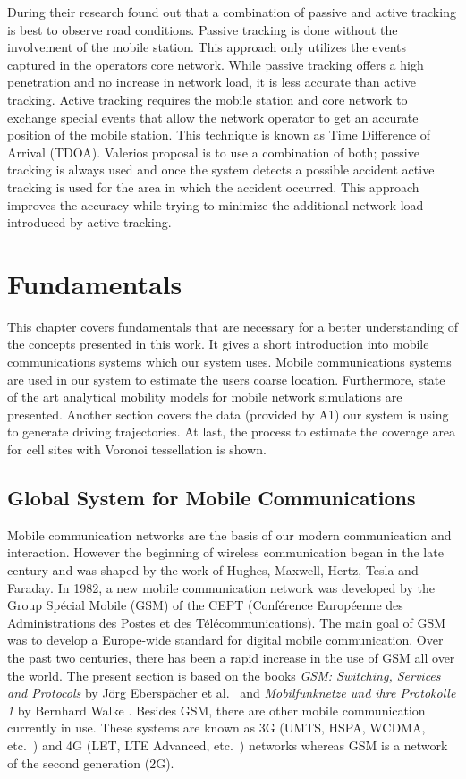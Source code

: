 \documentclass[master,english]{hgbthesis}
\begin{document}
During their research found out that a combination of passive and active tracking is best to observe road conditions. Passive tracking is done without the involvement of the mobile station. This approach only utilizes the events captured in the operators core network. While passive tracking offers a high penetration and no increase in network load, it is less accurate than active tracking. Active tracking requires the mobile station and core network to exchange special events that allow the network operator to get an accurate position of the mobile station. This technique is known as Time Difference of Arrival (TDOA). Valerios proposal is to use a combination of both; passive tracking is always used and once the system detects a possible accident active tracking is used for the area in which the accident occurred. This approach improves the accuracy while trying to minimize the additional network load introduced by active tracking.
\chapter{Fundamentals}
\label{cha:fundamentals}
This chapter covers fundamentals that are necessary for a better understanding of the concepts presented in this work. It gives a short introduction into mobile communications systems which our system uses. Mobile communications systems are used in our system to estimate the users coarse location. Furthermore, state of the art analytical mobility models for mobile network simulations are presented. Another section covers the data (provided by A1) our system is using to generate driving trajectories. At last, the process to estimate the coverage area for cell sites with Voronoi tessellation is shown.
\section{Global System for Mobile Communications}
Mobile communication networks are the basis of our modern communication and interaction. However the beginning of wireless communication began in the late  century and was shaped by the work of Hughes, Maxwell, Hertz, Tesla and Faraday.
In 1982, a new mobile communication network was developed by the Group Spécial Mobile (GSM) of the CEPT (Conférence Européenne des Administrations des Postes et des Télécommunications). The main goal of GSM was to develop a Europe-wide standard for digital mobile communication. Over the past two centuries, there has been a rapid increase in the use of GSM all over the world. The present section is based on the books \emph{GSM: Switching, Services and Protocols} by Jörg Eberspächer et al.\ \cite{Eberspaecher2001} and \emph{Mobilfunknetze und ihre Protokolle 1} by Bernhard Walke \cite{Walke2001}.
Besides GSM, there are other mobile communication currently in use. These systems are known as 3G (UMTS, HSPA, WCDMA, etc.\ ) and 4G (LET, LTE Advanced, etc.\ ) networks whereas GSM is a network of the second generation (2G).
\end{document}
